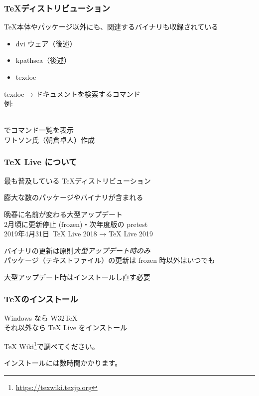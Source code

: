 \begin{frame}
	\frametitle{\TeX ディストリビューション}
	\TeX 本体やパッケージ以外にも、関連するバイナリも収録されている

	\begin{itemize}
		\item dvi ウェア（後述）
		\item kpathsea（後述）
		\item texdoc
	\end{itemize}

	texdoc → ドキュメントを検索するコマンド\\
	{\footnotesize 例: }

	\\でコマンド一覧を表示\\
	{\footnotesize ワトソン氏（朝倉卓人）作成}
\end{frame}

\begin{frame}
	\frametitle{{\TeX} Live について}
	最も普及している \TeX ディストリビューション

	膨大な数のパッケージやバイナリが含まれる

	晩春に名前が変わる大型アップデート\\
	{\footnotesize 2月頃に更新停止 (frozen)・次年度版の pretest\\
	2019年4月31日~{\TeX} Live 2018 → {\TeX} Live 2019}

	バイナリの更新は原則\emph{大型アップデート時のみ}\\
	{\footnotesize パッケージ（テキストファイル）の更新は frozen 時以外はいつでも}

	大型アップデート時はインストールし直す必要
\end{frame}


\begin{frame}
	\frametitle{\TeX のインストール}
	Windows なら W32TeX\\
	それ以外なら {\TeX} Live をインストール

	{\TeX} Wiki\footnote{\url{https://texwiki.texjp.org}}で調べてください。

	インストールには数時間かかります。
\end{frame}

